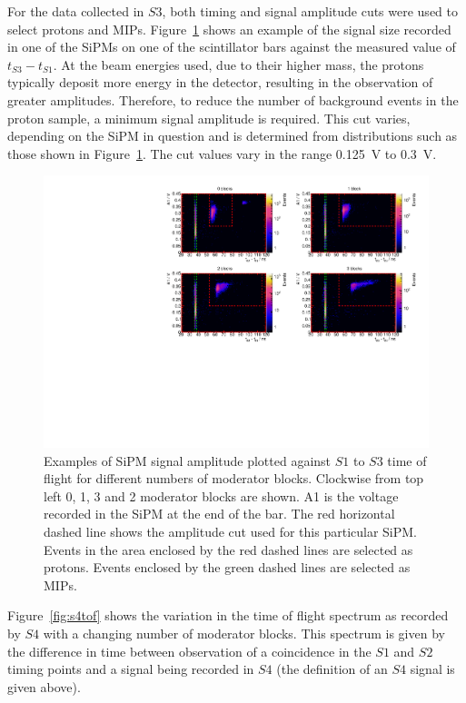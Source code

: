 For the data collected in $\mathit{S3}$, both timing and signal amplitude cuts were used to select protons and MIPs.
Figure~\ref{fig:TvsA} shows an example of the signal size recorded in one of the SiPMs on one of the scintillator bars against the measured value of $t_{\mathit{S3}} - t_{\mathit{S1}}$.
At the beam energies used, due to their higher mass, the protons typically deposit more energy in the detector, resulting in the observation of greater amplitudes.
Therefore, to reduce the number of background events in the proton sample, a minimum signal amplitude is required.
This cut varies, depending on the SiPM in question and is determined from distributions such as those shown in Figure~\ref{fig:TvsA}. 
The cut values vary in the range 0.125~V to 0.3~V.

\begin{figure}[ht]
  \centering
  \includegraphics[width=\linewidth]{files/Figures/tvsa.pdf}
  \caption{Examples of SiPM signal amplitude plotted against $\mathit{S1}$ to $\mathit{S3}$ time of flight for different numbers of moderator blocks. Clockwise from top left 0, 1, 3 and 2 moderator blocks are shown. A1 is the voltage recorded in the SiPM at the end of the bar. The red horizontal dashed line shows the amplitude cut used for this particular SiPM. Events in the area enclosed by the red dashed lines are selected as protons. Events enclosed by the green dashed lines are selected as MIPs.}
  \label{fig:TvsA}
\end{figure}

Figure~\ref{fig:s4tof} shows the variation in the time of flight spectrum as recorded by $\mathit{S4}$ with a changing number of moderator blocks.
This spectrum is given by the difference in time between observation of a coincidence in the $\mathit{S1}$ and $\mathit{S2}$ timing points and a signal being recorded in $\mathit{S4}$ (the definition of an $\mathit{S4}$ signal is given above).

